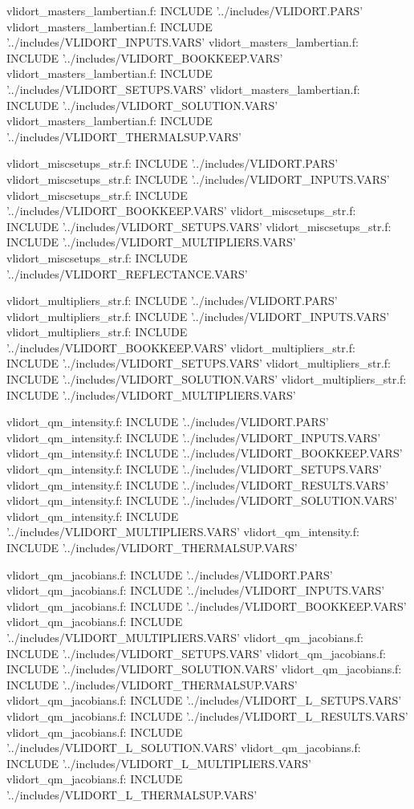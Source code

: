 vlidort_masters_lambertian.f:      INCLUDE '../includes/VLIDORT.PARS'
vlidort_masters_lambertian.f:      INCLUDE '../includes/VLIDORT_INPUTS.VARS'
vlidort_masters_lambertian.f:      INCLUDE '../includes/VLIDORT_BOOKKEEP.VARS'
vlidort_masters_lambertian.f:      INCLUDE '../includes/VLIDORT_SETUPS.VARS'
vlidort_masters_lambertian.f:      INCLUDE '../includes/VLIDORT_SOLUTION.VARS'
vlidort_masters_lambertian.f:      INCLUDE '../includes/VLIDORT_THERMALSUP.VARS'

vlidort_miscsetups_str.f:      INCLUDE '../includes/VLIDORT.PARS'
vlidort_miscsetups_str.f:      INCLUDE '../includes/VLIDORT_INPUTS.VARS'
vlidort_miscsetups_str.f:      INCLUDE '../includes/VLIDORT_BOOKKEEP.VARS'
vlidort_miscsetups_str.f:      INCLUDE '../includes/VLIDORT_SETUPS.VARS'
vlidort_miscsetups_str.f:      INCLUDE '../includes/VLIDORT_MULTIPLIERS.VARS'
vlidort_miscsetups_str.f:      INCLUDE '../includes/VLIDORT_REFLECTANCE.VARS'

vlidort_multipliers_str.f:      INCLUDE '../includes/VLIDORT.PARS'
vlidort_multipliers_str.f:      INCLUDE '../includes/VLIDORT_INPUTS.VARS'
vlidort_multipliers_str.f:      INCLUDE '../includes/VLIDORT_BOOKKEEP.VARS'
vlidort_multipliers_str.f:      INCLUDE '../includes/VLIDORT_SETUPS.VARS'
vlidort_multipliers_str.f:      INCLUDE '../includes/VLIDORT_SOLUTION.VARS'
vlidort_multipliers_str.f:      INCLUDE '../includes/VLIDORT_MULTIPLIERS.VARS'

vlidort_qm_intensity.f:      INCLUDE '../includes/VLIDORT.PARS'
vlidort_qm_intensity.f:      INCLUDE '../includes/VLIDORT_INPUTS.VARS'
vlidort_qm_intensity.f:      INCLUDE '../includes/VLIDORT_BOOKKEEP.VARS'
vlidort_qm_intensity.f:      INCLUDE '../includes/VLIDORT_SETUPS.VARS'
vlidort_qm_intensity.f:      INCLUDE '../includes/VLIDORT_RESULTS.VARS'
vlidort_qm_intensity.f:      INCLUDE '../includes/VLIDORT_SOLUTION.VARS'
vlidort_qm_intensity.f:      INCLUDE '../includes/VLIDORT_MULTIPLIERS.VARS'
vlidort_qm_intensity.f:      INCLUDE '../includes/VLIDORT_THERMALSUP.VARS'

vlidort_qm_jacobians.f:      INCLUDE '../includes/VLIDORT.PARS'
vlidort_qm_jacobians.f:      INCLUDE '../includes/VLIDORT_INPUTS.VARS'
vlidort_qm_jacobians.f:      INCLUDE '../includes/VLIDORT_BOOKKEEP.VARS'
vlidort_qm_jacobians.f:      INCLUDE '../includes/VLIDORT_MULTIPLIERS.VARS'
vlidort_qm_jacobians.f:      INCLUDE '../includes/VLIDORT_SETUPS.VARS'
vlidort_qm_jacobians.f:      INCLUDE '../includes/VLIDORT_SOLUTION.VARS'
vlidort_qm_jacobians.f:      INCLUDE '../includes/VLIDORT_THERMALSUP.VARS'
vlidort_qm_jacobians.f:      INCLUDE '../includes/VLIDORT_L_SETUPS.VARS'
vlidort_qm_jacobians.f:      INCLUDE '../includes/VLIDORT_L_RESULTS.VARS'
vlidort_qm_jacobians.f:      INCLUDE '../includes/VLIDORT_L_SOLUTION.VARS'
vlidort_qm_jacobians.f:      INCLUDE '../includes/VLIDORT_L_MULTIPLIERS.VARS'
vlidort_qm_jacobians.f:      INCLUDE '../includes/VLIDORT_L_THERMALSUP.VARS'

